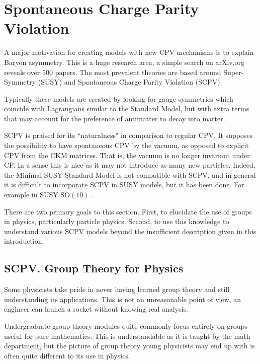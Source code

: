 \documentclass[floatfix,aps,prd,amsmath,amssymb]{revtex4}
\begin{document}
\section{Spontaneous Charge Parity Violation} 
A major motivation for creating models with new CPV mechanisms is to explain Baryon asymmetry. This is a huge research area, a simple search on arXiv.org reveals over $500$ papers. The most prevalent theories are based around Super-Symmetry (SUSY) and Spontaneous Charge Parity Violation (SCPV). 

Typically these models are created by looking for gauge symmetries which coincide with Lagrangians similar to the Standard Model, but with extra terms that may account for the preference of antimatter to decay into matter.  

SCPV is praised for its ``naturalness" in comparison to regular CPV\cite{SCPV1}. It supposes the possibility to have spontaneous CPV by the vacuum, as opposed to explicit CPV from the CKM matrices. That is, the vacuum is no longer invariant under CP. In a sense this is nice as it may not introduce as many new particles. Indeed, the Minimal SUSY Standard Model is not compatible with SCPV, and in general it is difficult to incorporate SCPV in SUSY models\cite{SCPV1}, but it has been done. For example in SUSY $\mathrm{SO}(10)$ \cite{SCPV2}.

There are two primary goals to this section. First, to elucidate the use of groups in physics, particularly particle physics. Second, to use this knowledge to understand various SCPV  models beyond the insufficient description given in this introduction.

\subsection{SCPV. Group Theory for Physics}
Some physicists take pride in never having learned group theory and still understanding its applications. This is not an unreasonable point of view, an engineer can launch a rocket without knowing real analysis. 

Undergraduate group theory modules quite commonly focus entirely on groups useful for pure mathematics. This is understandable as it is taught by the math department, but the picture of group theory young physicists may end up with is often quite different to its use in physics.
\end{document}
